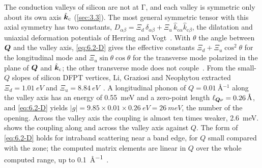 The conduction valleys of silicon are not at $\mathrm{\Gamma}$, and each valley is symmetric only about its own axis $\hat{\bm{k}}_{\mathrm{c}}$ (\cref{sec:3.3}). The most general symmetric tensor with this axial symmetry has two constants, $D_{\alpha\beta} = \Xi_d\,\delta_{\alpha\beta} + \Xi_u\,\hat k_{\mathrm{c}\alpha}\hat k_{\mathrm{c}\beta}$, the dilatation and uniaxial deformation potentials of Herring and Vogt~\cite{herring1956transport}. With $\theta$ the angle between $\bm{Q}$ and the valley axis, \cref{eq:6.2-D} gives the effective constants $\Xi_d + \Xi_u\cos^2\theta$ for the longitudinal mode and $\Xi_u\sin\theta\cos\theta$ for the transverse mode polarized in the plane of $\bm{Q}$ and $\hat{\bm{k}}_{\mathrm{c}}$; the other transverse mode does not couple~\cite[Eqs.~(13) and (14)]{li2021deformation}. From the small-$Q$ slopes of silicon DFPT vertices, Li, Graziosi and Neophytou extracted $\Xi_d = \SI{1.01}{eV}$ and $\Xi_u = \SI{8.84}{eV}$~\cite{li2021deformation}. A longitudinal phonon of $Q = \SI{0.01}{\angstrom^{-1}}$ along the valley axis has an energy of \SI{0.55}{meV} and a zero-point length $\ell_{\bm{Q}\nu} = \SI{0.26}{\angstrom}$, and \cref{eq:6.2-D} yields $|g| = 9.85\times0.01\times\SI{0.26}{eV} = \SI{26}{meV}$, the number of the opening. Across the valley axis the coupling is almost ten times weaker, \SI{2.6}{meV}.  shows the coupling along and across the valley axis against $Q$. The form of \cref{eq:6.2-D} holds for intraband scattering near a band edge, for $Q$ small compared with the zone; the computed matrix elements are linear in $Q$ over the whole computed range, up to \SI{0.1}{\angstrom^{-1}}~\cite[Fig.~5]{li2021deformation}.

